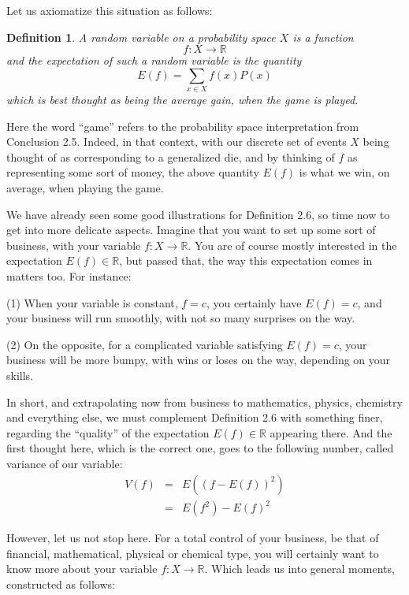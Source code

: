 \documentclass[12pt]{amsbook}
\newtheorem{definition}[theorem]{Definition}
\begin{document}
\bigskip

Let us axiomatize this situation as follows:

\begin{definition}
A random variable on a probability space $X$ is a function
$$f:X\to\mathbb R$$
and the expectation of such a random variable is the quantity
$$E(f)=\sum_{x\in X}f(x)P(x)$$
which is best thought as being the average gain, when the game is played.
\end{definition}

Here the word ``game'' refers to the probability space interpretation from Conclusion 2.5. Indeed, in that context, with our discrete set of events $X$ being thought of as corresponding to a generalized die, and by thinking of $f$ as representing some sort of money, the above quantity $E(f)$ is what we win, on average, when playing the game.

\bigskip

We have already seen some good illustrations for Definition 2.6, so time now to get into more delicate aspects. Imagine that you want to set up some sort of business, with your variable $f:X\to\mathbb R$. You are of course mostly interested in the expectation $E(f)\in\mathbb R$, but passed that, the way this expectation comes in matters too. For instance:

\bigskip

(1) When your variable is constant, $f=c$, you certainly have $E(f)=c$, and your business will run smoothly, with not so many surprises on the way.

\bigskip

(2) On the opposite, for a complicated variable satisfying $E(f)=c$, your business will be more bumpy, with wins or loses on the way, depending on your skills.

\bigskip

In short, and extrapolating now from business to mathematics, physics, chemistry and everything else, we must complement Definition 2.6 with something finer, regarding the ``quality'' of the expectation $E(f)\in\mathbb R$ appearing there. And the first thought here, which is the correct one, goes to the following number, called variance of our variable:
\begin{eqnarray*}
V(f)
&=&E\left((f-E(f))^2\right)\\
&=&E(f^2)-E(f)^2
\end{eqnarray*}

However, let us not stop here. For a total control of your business, be that of financial, mathematical, physical or chemical type, you will certainly want to know more about your variable $f:X\to\mathbb R$. Which leads us into general moments, constructed as follows:
\end{document}
